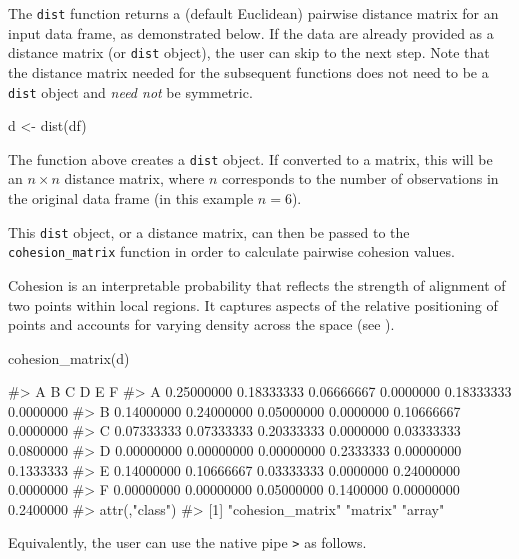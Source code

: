 The \texttt{dist} function returns a (default Euclidean) pairwise
distance matrix for an input data frame, as demonstrated below. If the
data are already provided as a distance matrix (or \texttt{dist}
object), the user can skip to the next step. Note that the distance
matrix needed for the subsequent functions does not need to be a
\texttt{dist} object and \emph{need not} be symmetric.

\begin{Schunk}
\begin{Sinput}
d <- dist(df)
\end{Sinput}
\end{Schunk}

The function above creates a \texttt{dist} object. If converted to a
matrix, this will be an \(n\times n\) distance matrix, where \(n\)
corresponds to the number of observations in the original data frame (in
this example \(n = 6\)).

This \texttt{dist} object, or a distance matrix, can then be passed to
the \texttt{cohesion\_matrix} function in order to calculate pairwise
cohesion values.

Cohesion is an interpretable probability that reflects the strength of
alignment of two points within local regions. It captures aspects of the
relative positioning of points and accounts for varying density across
the space (see \citet{berenhaut2022social}).

\begin{Schunk}
\begin{Sinput}
cohesion_matrix(d)
\end{Sinput}
\begin{Soutput}
#>            A          B          C         D          E         F
#> A 0.25000000 0.18333333 0.06666667 0.0000000 0.18333333 0.0000000
#> B 0.14000000 0.24000000 0.05000000 0.0000000 0.10666667 0.0000000
#> C 0.07333333 0.07333333 0.20333333 0.0000000 0.03333333 0.0800000
#> D 0.00000000 0.00000000 0.00000000 0.2333333 0.00000000 0.1333333
#> E 0.14000000 0.10666667 0.03333333 0.0000000 0.24000000 0.0000000
#> F 0.00000000 0.00000000 0.05000000 0.1400000 0.00000000 0.2400000
#> attr(,"class")
#> [1] "cohesion_matrix" "matrix"          "array"
\end{Soutput}
\end{Schunk}

Equivalently, the user can use the native pipe
\texttt{\textbar{}\textgreater{}} as follows.

